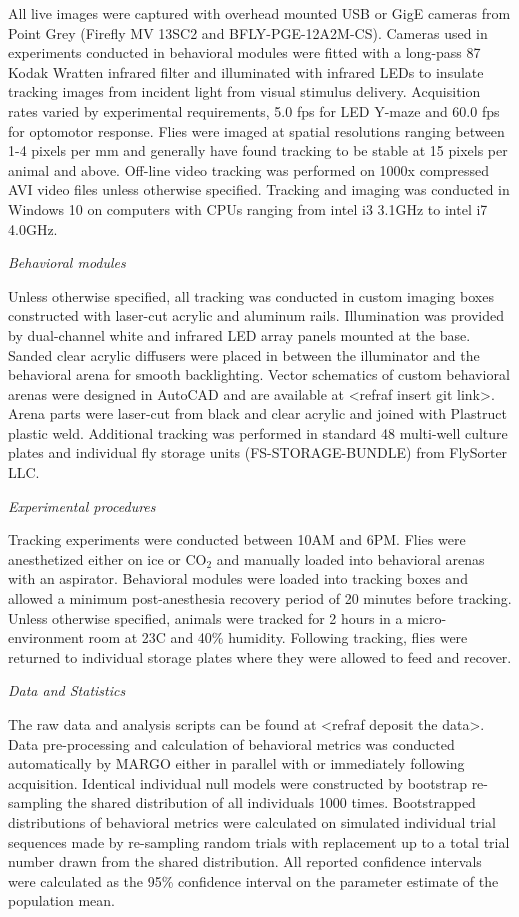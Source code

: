\documentclass[10pt]{article}
\begin{document}
\begin{multicols}{2}
All live images were captured with overhead mounted USB or GigE cameras from Point Grey (Firefly MV 13SC2 and BFLY-PGE-12A2M-CS). Cameras used in experiments conducted in behavioral modules were fitted with a long-pass 87 Kodak Wratten infrared filter and illuminated with infrared LEDs to insulate tracking images from incident light from visual stimulus delivery. Acquisition rates varied by experimental requirements, 5.0 fps for LED Y-maze and 60.0 fps for optomotor response. Flies were imaged at spatial resolutions ranging between 1-4 pixels per mm and generally have found tracking to be stable at 15 pixels per animal and above.  Off-line video tracking was performed on 1000x compressed AVI video files unless otherwise specified. Tracking and imaging was conducted in Windows 10 on computers with CPUs ranging from intel i3 3.1GHz to intel i7 4.0GHz. 

\textit{Behavioral modules}

Unless otherwise specified, all tracking was conducted in custom imaging boxes constructed with laser-cut acrylic and aluminum rails. Illumination was provided by dual-channel white and infrared LED array panels mounted at the base. Sanded clear acrylic diffusers were placed in between the illuminator and the behavioral arena for smooth backlighting. Vector schematics of custom behavioral arenas were designed in AutoCAD and are available at <refraf insert git link>. Arena parts were laser-cut from black and clear acrylic and joined with Plastruct plastic weld. Additional tracking was performed in standard 48 multi-well culture plates and individual fly storage units (FS-STORAGE-BUNDLE) from FlySorter LLC.

\textit{Experimental procedures}

Tracking experiments were conducted between 10AM and 6PM. Flies were anesthetized either on ice or CO$_{2}$ and manually loaded into behavioral arenas with an aspirator. Behavioral modules were loaded into tracking boxes and allowed a minimum post-anesthesia recovery period of 20 minutes before tracking. Unless otherwise specified, animals were tracked for 2 hours in a micro-environment room at 23\degree  C and 40\% humidity. Following tracking, flies were returned to individual storage plates where they were allowed to feed and recover.

\textit{Data and Statistics}

The raw data and analysis scripts can be found at <refraf deposit the data>. Data pre-processing and calculation of behavioral metrics was conducted automatically by MARGO either in parallel with or immediately following acquisition. Identical individual null models were constructed by bootstrap re-sampling the shared distribution of all individuals 1000 times. Bootstrapped distributions of behavioral metrics were calculated on simulated individual trial sequences made by re-sampling random trials with replacement up to a total trial number drawn from the shared distribution. All reported confidence intervals were calculated as the 95\% confidence interval on the parameter estimate of the population mean.


\end{multicols}
\end{document}
